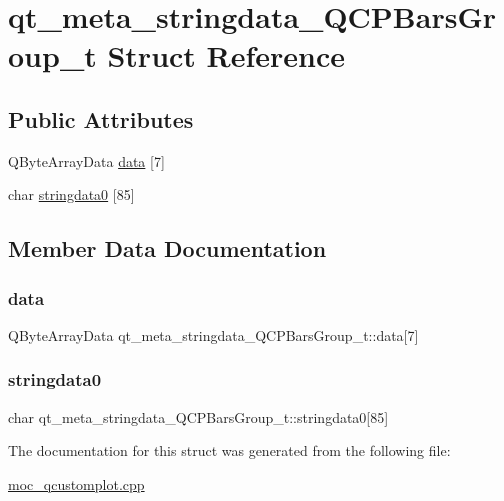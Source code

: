 \hypertarget{structqt__meta__stringdata__QCPBarsGroup__t}{}\section{qt\+\_\+meta\+\_\+stringdata\+\_\+\+Q\+C\+P\+Bars\+Group\+\_\+t Struct Reference}
\label{structqt__meta__stringdata__QCPBarsGroup__t}
\subsection*{Public Attributes}
\begin{DoxyCompactItemize}
\item 
Q\+Byte\+Array\+Data \mbox{\hyperlink{structqt__meta__stringdata__QCPBarsGroup__t_a4af132fa7aa52aa1a2e32fed4547ee11}{data}} \mbox{[}7\mbox{]}
\item 
char \mbox{\hyperlink{structqt__meta__stringdata__QCPBarsGroup__t_a2dd46435dea832cba9d6432a1b729650}{stringdata0}} \mbox{[}85\mbox{]}
\end{DoxyCompactItemize}


\subsection{Member Data Documentation}
\mbox{\label{structqt__meta__stringdata__QCPBarsGroup__t_a4af132fa7aa52aa1a2e32fed4547ee11}} 
\subsubsection{\texorpdfstring{data}{data}}
{\footnotesize\ttfamily Q\+Byte\+Array\+Data qt\+\_\+meta\+\_\+stringdata\+\_\+\+Q\+C\+P\+Bars\+Group\+\_\+t\+::data\mbox{[}7\mbox{]}}

\mbox{\label{structqt__meta__stringdata__QCPBarsGroup__t_a2dd46435dea832cba9d6432a1b729650}} 
\subsubsection{\texorpdfstring{stringdata0}{stringdata0}}
{\footnotesize\ttfamily char qt\+\_\+meta\+\_\+stringdata\+\_\+\+Q\+C\+P\+Bars\+Group\+\_\+t\+::stringdata0\mbox{[}85\mbox{]}}



The documentation for this struct was generated from the following file\+:\begin{DoxyCompactItemize}
\item 
\mbox{\hyperlink{moc__qcustomplot_8cpp}{moc\+\_\+qcustomplot.\+cpp}}\end{DoxyCompactItemize}
